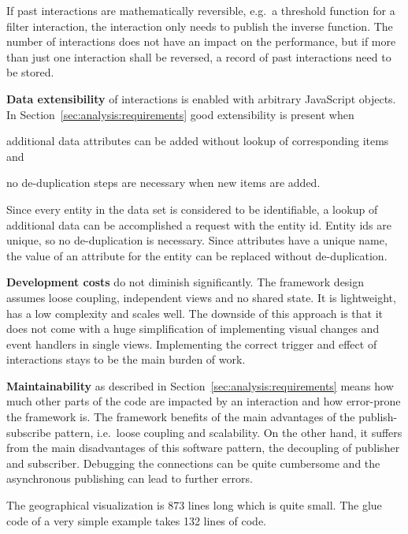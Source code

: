 If past interactions are mathematically reversible, e.g.\ a threshold function for a filter interaction, the  interaction only needs to publish the inverse function.
The number of interactions does not have an impact on the performance, but if more than just one interaction shall be reversed, a record of past interactions need to be stored.

\textbf{Data extensibility} of interactions is enabled with arbitrary JavaScript objects.
In Section~\ref{sec:analysis:requirements} good extensibility is present when
\begin{enumerate*}[label=(\arabic*)]
  \item
    additional data attributes can be added without lookup of corresponding items and
  \item
    no de-duplication steps are necessary when new items are added.
\end{enumerate*}
Since every entity in the data set is considered to be identifiable, a lookup of additional data can be accomplished a request with the entity id.
Entity ids are unique, so no de-duplication is necessary.
Since attributes have a unique name, the value of an attribute for the entity can be replaced without de-duplication.

\textbf{Development costs} do not diminish significantly.
The framework design assumes loose coupling, independent views and no shared state.
It is lightweight, has a low complexity and scales well.
The downside of this approach is that it does not come with a huge simplification of implementing visual changes and event handlers in single views.
Implementing the correct trigger and effect of interactions stays to be the main burden of work.

\textbf{Maintainability} as described in Section~\ref{sec:analysis:requirements} means how much other parts of the code are impacted by an interaction and how error-prone the framework is.
The framework benefits of the main advantages of the publish-subscribe pattern, i.e.\ loose coupling and scalability.
On the other hand, it suffers from the main disadvantages of this software pattern, the decoupling of publisher and subscriber.
Debugging the connections can be quite cumbersome and the asynchronous publishing can lead to further errors.

The geographical visualization is 873 lines long which is quite small.
The glue code of a very simple example takes 132 lines of code.


